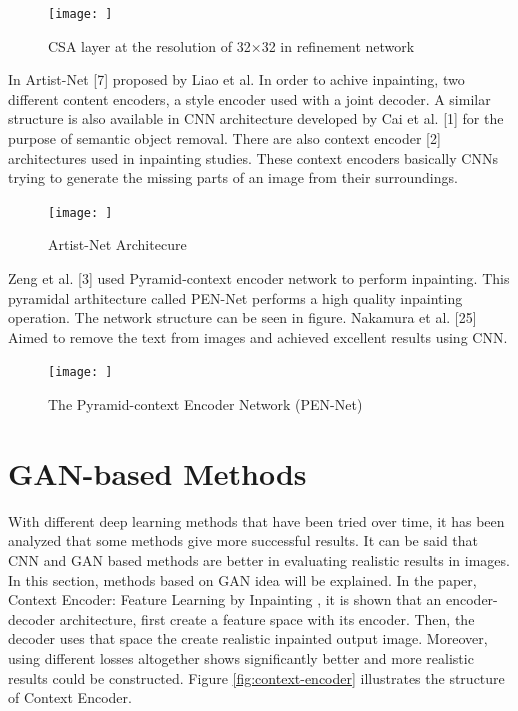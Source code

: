 \begin{figure}[h]
    \centering
    \texttt{[image: ]}
    \caption{CSA layer at the resolution of 32×32 in refinement network}
    \label{fig:my_label}
\end{figure}

In Artist-Net [7] proposed by Liao et al. In order to achive inpainting, two different content encoders, a style encoder used with a joint decoder. A similar structure is also available in CNN architecture developed by Cai et al. [1] for the purpose of semantic object removal. There are also context encoder [2] architectures used in inpainting studies. These context encoders basically CNNs trying to generate the missing parts of an image from their surroundings.

\begin{figure}[h]
    \centering
    \texttt{[image: ]}
    \caption{Artist-Net Architecure}
    \label{fig:my_label}
\end{figure}

Zeng et al. [3] used Pyramid-context encoder network to perform inpainting. This pyramidal arthitecture called PEN-Net performs a high quality inpainting operation. The network structure can be seen in figure. Nakamura et al. [25] Aimed to remove the text from images and achieved excellent results using CNN.

\begin{figure}[h]
    \centering
    \texttt{[image: ]}
    \caption{The Pyramid-context Encoder Network (PEN-Net)}
    \label{fig:my_label}
\end{figure}

\section{GAN-based Methods}

With different deep learning methods that have been tried over time, it has been analyzed that some methods give more successful results. It can be said that CNN and GAN based methods are better in evaluating realistic results in images. In this section, methods based on GAN idea will be explained. \newline
In the paper, Context Encoder: Feature Learning by Inpainting \cite{context_encoders}, it is shown that an encoder-decoder architecture, first create a feature space with its encoder. Then, the decoder uses that space the create realistic inpainted output image. Moreover, using different losses altogether shows significantly better and more realistic results could be constructed. Figure \ref{fig:context-encoder} illustrates the structure of Context Encoder.

